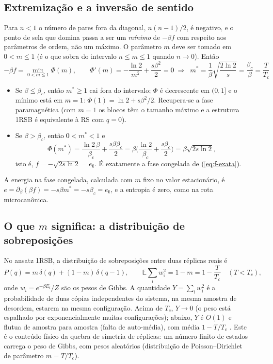 \documentclass[11pt,a4paper]{article}
\newcommand{\E}{\mathbb{E}}
\begin{document}
\subsection{Extremização e a inversão de sentido}
Para $n<1$ o número de pares fora da diagonal, $n(n-1)/2$, é negativo, e o ponto de sela que domina passa
a ser um \emph{mínimo} de $-\beta f$ com respeito aos parâmetros de ordem, não um máximo. O parâmetro
$m$ deve ser tomado em $0<m\le1$ (é o que sobra do intervalo $n\le m\le1$ quando $n\to0$). Então
\begin{equation}
  -\beta f=\min_{0<m\le1}\Phi(m),\qquad
  \Phi'(m)=-\frac{\ln2}{m^2}+\frac{s\beta^2}{2}=0
  \;\Longrightarrow\;
  \boxed{\;m^*=\frac{1}{\beta}\sqrt{\frac{2\ln2}{s}}=\frac{\beta_c}{\beta}=\frac{T}{T_c}\;}
\end{equation}
\begin{itemize}
\item Se $\beta\le\beta_c$, então $m^*\ge1$ cai fora do intervalo; $\Phi$ é decrescente em $(0,1]$ e o
mínimo está em $m=1$: $\Phi(1)=\ln2+s\beta^2/2$. Recupera-se a fase paramagnética (com $m=1$ os blocos
têm o tamanho máximo e a estrutura 1RSB é equivalente à RS com $q=0$).
\item Se $\beta>\beta_c$, então $0<m^*<1$ e
\begin{equation}
  \Phi(m^*)=\frac{\ln2\,\beta}{\beta_c}+\frac{s\beta\beta_c}{2}
  =\beta\Big(\frac{\ln2}{\beta_c}+\frac{s\beta_c}{2}\Big)=\beta\sqrt{2s\ln2},
\end{equation}
isto é, $f=-\sqrt{2s\ln2}=e_0$. É exatamente a fase congelada de (\ref{eq:f-exata}).
\end{itemize}
A energia na fase congelada, calculada com $m$ fixo no valor estacionário, é
$e=\partial_\beta(\beta f)=-s\beta m^*=-s\beta_c=e_0$, e a entropia é zero, como na rota microcanônica.

\subsection{O que $m$ significa: a distribuição de sobreposições}
No ansatz 1RSB, a distribuição de sobreposições entre duas réplicas reais é
\begin{equation}
  P(q)=m\,\delta(q)+(1-m)\,\delta(q-1),\qquad
  \E\sum_i w_i^2=1-m=1-\frac{T}{T_c}\quad(T<T_c),
\end{equation}
onde $w_i=e^{-\beta E_i}/Z$ são os pesos de Gibbs. A quantidade $Y=\sum_iw_i^2$ é a probabilidade de duas
cópias independentes do sistema, na mesma amostra de desordem, estarem na mesma configuração. Acima de
$T_c$, $Y\to0$ (o peso está espalhado por exponencialmente muitas configurações); abaixo, $Y$ é $O(1)$ e
flutua de amostra para amostra (falta de auto-média), com média $1-T/T_c$ \cite{derrida-mottishaw}.
Este é o conteúdo físico da quebra de simetria de réplicas: um número finito de estados carrega o peso
de Gibbs, com pesos aleatórios (distribuição de Poisson--Dirichlet de parâmetro $m=T/T_c$).
\end{document}
